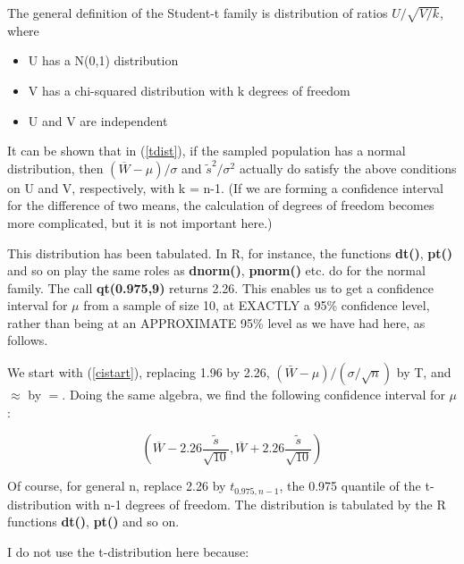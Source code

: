 The general definition of the Student-t family is distribution of ratios
$U / \sqrt{V/k}$, where

\begin{itemize}

\item U has a N(0,1) distribution 

\item V has a chi-squared distribution with k degrees of freedom 

\item U and V are independent 

\end{itemize}

It can be shown that in (\ref{tdist}), if the sampled population has a
normal distribution, then $(\overline{W} - \mu)/\sigma$ and
$\tilde{s}^2/\sigma^2$ actually do satisfy the above conditions on U and
V, respectively, with k = n-1.  (If we are forming a confidence interval
for the difference of two means, the calculation of degrees of freedom
becomes more complicated, but it is not important here.)

This distribution has been tabulated.  In R, for instance, the functions
{\bf dt()}, {\bf pt()} and so on play the same roles as {\bf dnorm()},
{\bf pnorm()} etc. do for the normal family.  The call {\bf qt(0.975,9)}
returns 2.26.  This enables us to get a confidence interval for $\mu$
from a sample of size 10, at EXACTLY a 95\% confidence level, rather
than being at an APPROXIMATE 95\% level as we have had here, as follows.

We start with (\ref{cistart}), replacing 1.96 by 2.26, $ (\bar{W}-\mu) /
(\sigma/\sqrt{n})$ by T, and $\approx$ by $=$.  Doing the same algebra,
we find the following confidence interval for $\mu$:

\begin{equation}
(\overline{W} - 2.26 \frac{\tilde{s}}{\sqrt{10}}, \overline{W} + 2.26
\frac{\tilde{s}}{\sqrt{10}})
\end{equation}

Of course,  for general n, replace 2.26 by $t_{0.975,n-1}$, the 0.975
quantile of the t-distribution with n-1 degrees of freedom.  The
distribution is tabulated by the R functions {\bf dt()}, {\bf pt()} and
so on.

I do not use the t-distribution here because:

